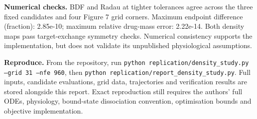 \documentclass[10pt,a4paper]{article}
\begin{document}
\textbf{Numerical checks.} BDF and Radau at tighter tolerances agree across the three fixed candidates and four Figure 7 grid corners. Maximum endpoint difference (fraction): 2.85e-10; maximum relative drug-mass error: 2.22e-14. Both density maps pass target-exchange symmetry checks. Numerical consistency supports the implementation, but does not validate its unpublished physiological assumptions.

\textbf{Reproduce.} From the repository, run \texttt{python replication/density\_study.py --grid 31 --nfe 960}, then \texttt{python replication/report\_density\_study.py}. Full inputs, candidate evaluations, grid data, trajectories and verification results are stored alongside this report. Exact reproduction still requires the authors' full ODEs, physiology, bound-state dissociation convention, optimisation bounds and objective implementation.
\end{document}
